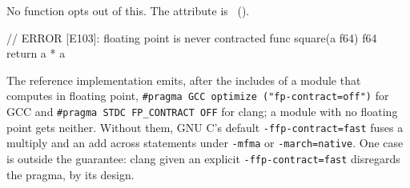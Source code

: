 \begin{constraint}
  No function opts out of this.  The attribute  is
  \illformed{}~().
\end{constraint}

\begin{laincode}
                     // ERROR [E103]: floating point is never contracted
func square(a f64) f64 {
    return a * a
}
\end{laincode}

\begin{note}
  The reference implementation emits, after the includes of a module that computes in floating
  point, \texttt{\#pragma GCC optimize ("fp-contract=off")} for GCC and
  \texttt{\#pragma STDC FP\_CONTRACT OFF} for clang; a module with no floating point gets
  neither.  Without them, GNU C's default \texttt{-ffp-contract=fast} fuses a multiply and an add
  across statements under \texttt{-mfma} or \texttt{-march=native}.  One case is outside the
  guarantee: clang given an explicit \texttt{-ffp-contract=fast} disregards the pragma, by its
  design.
\end{note}
